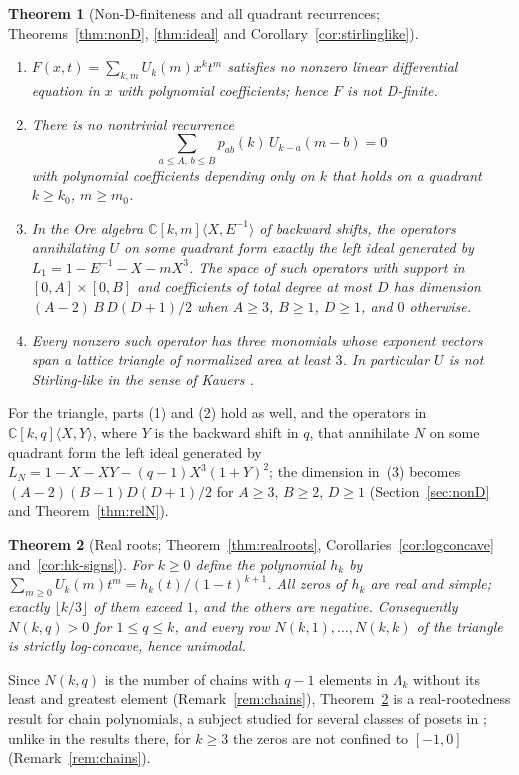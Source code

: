 \documentclass[11pt]{amsart}
\newtheorem{introthm}{Theorem}
\theoremstyle{definition}
\newcommand{\C}{\mathbb{C}}
\begin{document}
\begin{introthm}[Non-D-finiteness and all quadrant recurrences; Theorems~\ref{thm:nonD}, \ref{thm:ideal} and Corollary~\ref{cor:stirlinglike}]\label{intro:ideal}\leavevmode
\begin{enumerate}
\item $F(x,t)=\sum_{k,m}U_k(m)x^kt^m$ satisfies no nonzero linear differential equation in $x$ with polynomial coefficients; hence $F$ is not D-finite.
\item There is no nontrivial recurrence
\[
  \sum_{a\le A,\,b\le B}p_{ab}(k)\,U_{k-a}(m-b)=0
\]
with polynomial coefficients depending only on $k$ that holds on a quadrant $k\ge k_0$, $m\ge m_0$.
\item In the Ore algebra $\C[k,m]\langle X,E^{-1}\rangle$ of backward shifts, the operators annihilating $U$ on some quadrant form exactly the left ideal generated by $L_1=1-E^{-1}-X-mX^3$. The space of such operators with support in $[0,A]\times[0,B]$ and coefficients of total degree at most $D$ has dimension $(A-2)\,B\,D(D+1)/2$ when $A\ge3$, $B\ge1$, $D\ge1$, and $0$ otherwise.
\item Every nonzero such operator has three monomials whose exponent vectors span a lattice triangle of normalized area at least $3$. In particular $U$ is not Stirling-like in the sense of Kauers \cite{Kauers07}.
\end{enumerate}
\end{introthm}

For the triangle, parts (1) and (2) hold as well, and the operators in $\C[k,q]\langle X,Y\rangle$, where $Y$ is the backward shift in $q$, that annihilate $N$ on some quadrant form the left ideal generated by $L_N=1-X-XY-(q-1)X^3(1+Y)^2$; the dimension in~(3) becomes $(A-2)(B-1)D(D+1)/2$ for $A\ge3$, $B\ge2$, $D\ge1$ (Section~\ref{sec:nonD} and Theorem~\ref{thm:relN}).

\begin{introthm}[Real roots; Theorem~\ref{thm:realroots}, Corollaries~\ref{cor:logconcave} and~\ref{cor:hk-signs}]\label{intro:roots}
For $k\ge0$ define the polynomial $h_k$ by $\sum_{m\ge0}U_k(m)t^m=h_k(t)/(1-t)^{k+1}$. All zeros of $h_k$ are real and simple; exactly $\lfloor k/3\rfloor$ of them exceed $1$, and the others are negative. Consequently $N(k,q)>0$ for $1\le q\le k$, and every row $N(k,1),\dots,N(k,k)$ of the triangle is strictly log-concave, hence unimodal.
\end{introthm}

Since $N(k,q)$ is the number of chains with $q-1$ elements in $\Lambda_k$ without its least and greatest element (Remark~\ref{rem:chains}), Theorem~\ref{intro:roots} is a real-rootedness result for chain polynomials, a subject studied for several classes of posets in \cite{AK23,ADK24,BL26}; unlike in the results there, for $k\ge3$ the zeros are not confined to $[-1,0]$ (Remark~\ref{rem:chains}).
\end{document}

